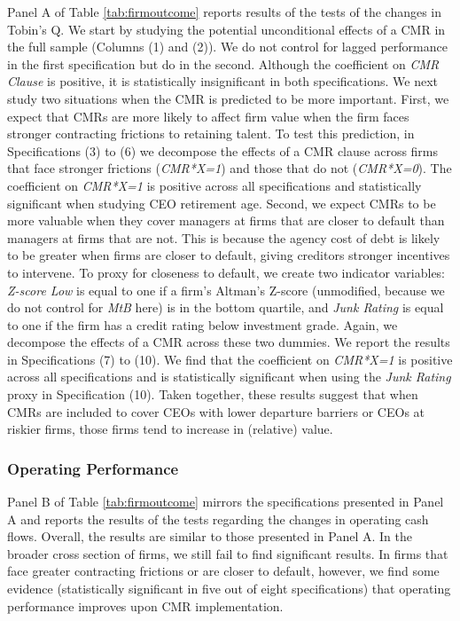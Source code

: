 \documentclass[a4paper,12pt]{article}
\begin{document}
Panel A of Table \ref{tab:firmoutcome} reports results of the tests of the changes in Tobin's Q.
We start by studying the potential unconditional effects of a CMR in the full sample (Columns (1) and (2)).
We do not control for lagged performance in the first specification but do in the second.
Although the coefficient on \textit{CMR Clause} is positive, it is statistically insignificant in both specifications.
We next study two situations when the CMR is predicted to be more important.
First, we expect that CMRs are more likely to affect firm value when the firm faces stronger contracting frictions to retaining talent.
To test this prediction, in Specifications (3) to (6) we decompose the effects of a CMR clause across firms that face stronger frictions (\textit{CMR*X=1}) and those that do not (\textit{CMR*X=0}).
The coefficient on \textit{CMR*X=1} is positive across all specifications and statistically significant when studying CEO retirement age.
Second, we expect CMRs to be more valuable when they cover managers at firms that are closer to default than managers at firms that are not.
This is because the agency cost of debt is likely to be greater when firms are closer to default, giving creditors stronger incentives to intervene.
To proxy for closeness to default, we create two indicator variables: \textit{Z-score Low} is equal to one if a firm's Altman's Z-score (unmodified, because we do not control for \textit{MtB} here) is in the bottom quartile, and \textit{Junk Rating} is equal to one if the firm has a credit rating below investment grade.
Again, we decompose the effects of a CMR across these two dummies.
We report the results in Specifications (7) to (10).
We find that the coefficient on \textit{CMR*X=1} is positive across all specifications and is statistically significant when using the \textit{Junk Rating} proxy in Specification (10).
Taken together, these results suggest that when CMRs are included to cover CEOs with lower departure barriers or CEOs at riskier firms, those firms tend to increase in (relative) value.




\subsubsection{Operating Performance}

Panel B of Table \ref{tab:firmoutcome} mirrors the specifications presented in Panel A and reports the results of the tests regarding the changes in operating cash flows.
Overall, the results are similar to those presented in Panel A.
In the broader cross section of firms, we still fail to find significant results.
In firms that face greater contracting frictions or are closer to default, however, we find some evidence (statistically significant in five out of eight specifications) that operating performance improves upon CMR implementation.
\end{document}
